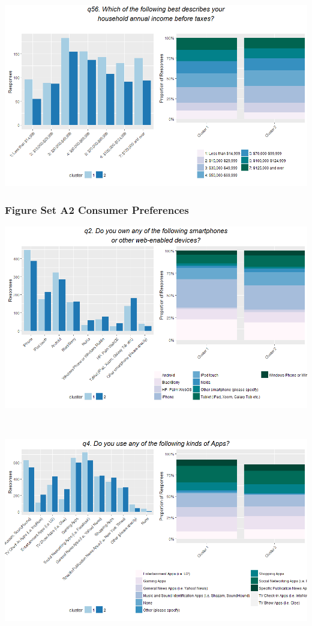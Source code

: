 \documentclass[]{article}
\begin{document}
~

\includegraphics[width=6.25000in]{images/barplot_q56.recat.png}

\newpage

\subsubsection{Figure Set A2 Consumer
Preferences}\label{figure-set-a2-consumer-preferences}

\includegraphics[width=6.25000in]{images/barplot_q2r1.png}

~

\includegraphics[width=6.25000in]{images/barplot_q4r1.png}
\end{document}
